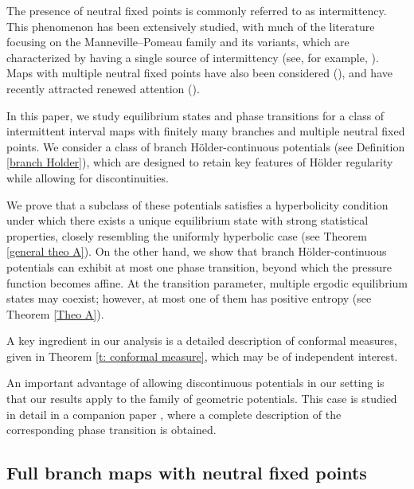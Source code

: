 \documentclass[10pt,a4paper]{amsart}
\numberwithin{equation}{section} %
\numberwithin{figure}{section} %
\renewcommand{\=}{\coloneqq}
\begin{document}
The presence of neutral fixed points is commonly referred to as intermittency. This phenomenon has been extensively studied, with much of the literature focusing on the Manneville--Pomeau family and its variants, which are characterized by having a single source of intermittency (see, for example, \cite{BaladiTodd,BruinTerhesiuTodd,CastroVarandas,ClimenhagaThompson,coronelRivera1,coronelRivera2,GaribaldiInoquio1,GaribaldiInoquio2,Gouzel2,Holland,LiRivera2,Liverani,MelbourneTerhesiu,PollicottWeiss,PrellbergSlawny,Sarig1,Sarig2}). Maps with multiple neutral fixed points have also been considered (\cite{MelbourneTerhesiu,Thaler1,Thaler2,Thaler3,zweimuller1,zweimuller2}), and have recently attracted renewed attention (\cite{coatesGelfert,coatesMelbourne,CoatesMelbourneTalebi,coatesLuzzatto,coatesLuzzattoMubarak}).

In this paper, we study equilibrium states and phase transitions for a class of intermittent interval maps with finitely many branches and multiple neutral fixed points. We consider a class of branch Hölder-continuous potentials (see Definition \ref{branch Holder}), which are designed to retain key features of Hölder regularity while allowing for discontinuities.

We prove that a subclass of these potentials satisfies a hyperbolicity condition under which there exists a unique equilibrium state with strong statistical properties, closely resembling the uniformly hyperbolic case (see Theorem \ref{general theo A}). On the other hand, we show that branch Hölder-continuous potentials can exhibit at most one phase transition, beyond which the pressure function becomes affine. At the transition parameter, multiple ergodic equilibrium states may coexist; however, at most one of them has positive entropy (see Theorem \ref{Theo A}).

A key ingredient in our analysis is a detailed description of conformal measures, given in Theorem \ref{t: conformal measure}, which may be of independent interest.

An important advantage of allowing discontinuous potentials in our setting is that our results apply to the family of geometric potentials. This case is studied in detail in a companion paper \cite{CoronelMonardes}, where a complete description of the corresponding phase transition is obtained.

\subsection{Full branch maps with neutral fixed points}
\end{document}
